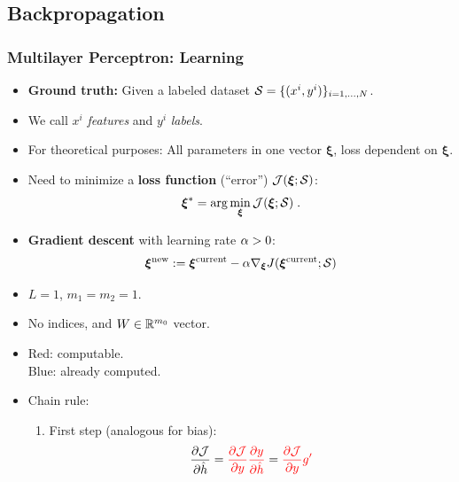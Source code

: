 \documentclass[10pt,hyperref={pdfpagelabels=false}]{beamer}
\begin{document}
\subsection{Backpropagation}
\begin{frame}[allowframebreaks]
    \frametitle{Multilayer Perceptron: Learning}
    \begin{itemize}
        \item {\bf Ground truth:} Given a labeled dataset $\mathcal{S}=\{(x^i, y^i)\}_{i=1,\dots,N}$.
        \item We call $x^i$ \emph{features} and $y^i$ \emph{labels}.
        \item For theoretical purposes: All parameters in one vector $\boldsymbol{\xi}$, loss dependent on $\boldsymbol{\xi}$.
        \item Need to minimize a {\bf loss function} (``error'') $\mathcal{J}(\boldsymbol{\xi}; \mathcal{S})$:
        $$
        \boldsymbol{\xi}^\ast = \arg\min_{\boldsymbol{\xi}} \mathcal{J}(\boldsymbol{\xi}; \mathcal{S})
        \;.
        $$
        \item {\bf Gradient descent} with learning rate $\alpha>0$:
        $$
            \boldsymbol{\xi}^{\text{new}} := \boldsymbol{\xi}^{\text{current}}
            - \alpha \nabla_{\boldsymbol{\xi}}J(\boldsymbol{\xi}^{\text{current}};\mathcal{S})
        $$
    \end{itemize}
    \framebreak
    \centering
    \framebreak
    \begin{minipage}{.6\textwidth}
        {\small
        \begin{itemize}
            \item $L=1$, $m_1=m_{2}=1$.
            \item No indices, and $W\in\mathbb{R}^{m_0}$ vector.
            \item {\color{red}Red:} computable. \\
            {\color{blue}Blue:} already computed.
            \item Chain rule:
            \begin{enumerate}
                \item First step (analogous for bias):
                $$
                \frac{\partial\mathcal{J}}{\partial \hat{h}} =
                {\color{red}
                \frac{\partial\mathcal{J}}{\partial y} \frac{\partial y}{\partial \hat{h}}}
                =
                {\color{red}\frac{\partial\mathcal{J}}{\partial y}} {\color{red}g'}
$$
\end{enumerate}
\end{itemize}}
\end{minipage}
\end{frame}
\end{document}
